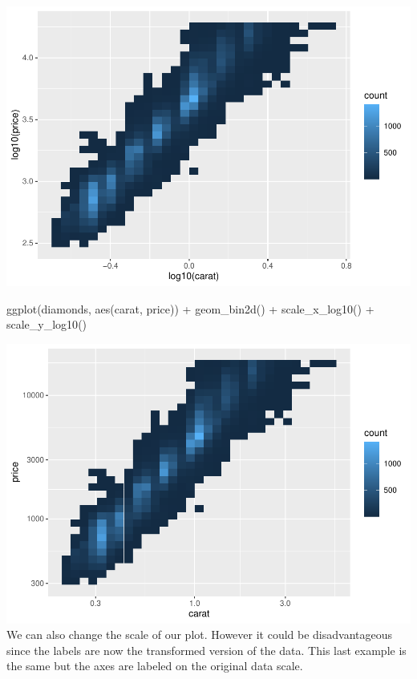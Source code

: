 \documentclass[
]{article}
\newenvironment{Shaded}{\begin{snugshade}}{\end{snugshade}}
\newcommand{\FunctionTok}[1]{\textcolor[rgb]{0.00,0.00,0.00}{#1}}
\newcommand{\NormalTok}[1]{#1}
\newcommand{\SpecialCharTok}[1]{\textcolor[rgb]{0.00,0.00,0.00}{#1}}
\begin{document}
\includegraphics{Journal_files/figure-latex/unnamed-chunk-64-2.pdf}

\begin{Shaded}
\begin{Highlighting}[]
\FunctionTok{ggplot}\NormalTok{(diamonds, }\FunctionTok{aes}\NormalTok{(carat, price)) }\SpecialCharTok{+}
  \FunctionTok{geom\_bin2d}\NormalTok{() }\SpecialCharTok{+} 
  \FunctionTok{scale\_x\_log10}\NormalTok{() }\SpecialCharTok{+} 
  \FunctionTok{scale\_y\_log10}\NormalTok{()}
\end{Highlighting}
\end{Shaded}

\includegraphics{Journal_files/figure-latex/unnamed-chunk-64-3.pdf} We
can also change the scale of our plot. However it could be
disadvantageous since the labels are now the transformed version of the
data. This last example is the same but the axes are labeled on the
original data scale.
\end{document}
